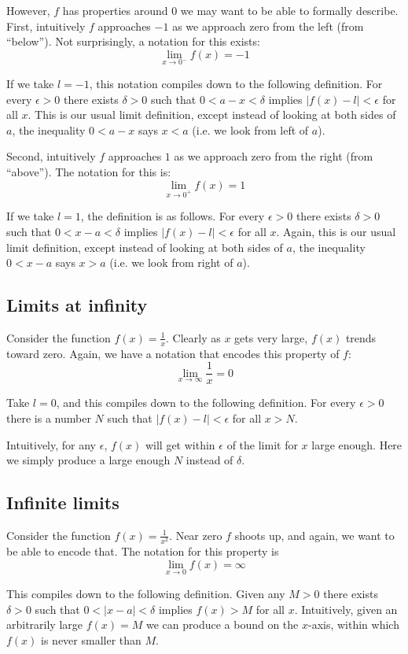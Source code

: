 However, $f$ has properties around $0$ we may want to be able to
formally describe. First, intuitively $f$ approaches $-1$ as we
approach zero from the left (from ``below''). Not surprisingly, a
notation for this exists:
\[\lim_{x\to0^-}f(x)=-1\]

If we take $l=-1$, this notation compiles down to the following
definition. For every $\epsilon>0$ there exists $\delta>0$ such that
$0<a-x<\delta$ implies $|f(x)-l|<\epsilon$ for all $x$. This is our usual limit
definition, except instead of looking at both sides of $a$, the
inequality $0<a-x$ says $x<a$ (i.e. we look from left of $a$).

\vs

Second, intuitively $f$ approaches $1$ as we approach zero from the
right (from ``above''). The notation for this is:
\[\lim_{x\to0^+}f(x)=1\]

If we take $l=1$, the definition is as follows. For every $\epsilon>0$ there
exists $\delta>0$ such that $0<x-a<\delta$ implies $|f(x)-l|<\epsilon$ for all
$x$. Again, this is our usual limit definition, except instead of
looking at both sides of $a$, the inequality $0<x-a$ says $x>a$ (i.e.
we look from right of $a$).

\subsection{Limits at infinity}
Consider the function $f(x)=\frac{1}{x}$. Clearly as $x$ gets very
large, $f(x)$ trends toward zero. Again, we have a notation that
encodes this property of $f$:
\[\lim_{x\to\infty}\frac{1}{x}=0\]

Take $l=0$, and this compiles down to the following definition. For
every $\epsilon>0$ there is a number $N$ such that $|f(x)-l|<\epsilon$ for all
$x>N$.

\vs

Intuitively, for any $\epsilon$, $f(x)$ will get within $\epsilon$ of the limit for
$x$ large enough. Here we simply produce a large enough $N$ instead of
$\delta$.

\subsection{Infinite limits}
Consider the function $f(x)=\frac{1}{x^2}$. Near zero $f$ shoots up,
and again, we want to be able to encode that. The notation for this
property is
\[\lim_{x\to0}f(x)=\infty\]

This compiles down to the following definition. Given any $M>0$ there
exists $\delta>0$ such that $0<|x-a|<\delta$ implies $f(x)>M$ for all
$x$. Intuitively, given an arbitrarily large $f(x)=M$ we can produce a
bound on the $x$-axis, within which $f(x)$ is never smaller than $M$.

